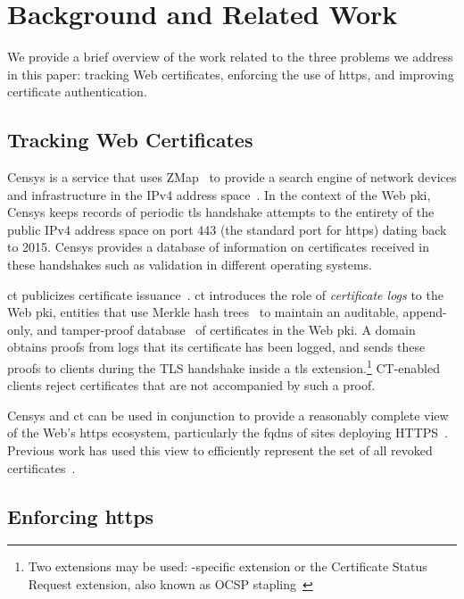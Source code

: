 \section{Background and Related Work}
\label{sec:background}

We provide a brief overview of the work related to the three problems we address
in this paper: tracking Web certificates, enforcing the use of \ac{https}, and
improving certificate authentication.

\subsection{Tracking Web Certificates}\label{sec:tracking}

Censys is a service that uses ZMap~\cite{durumeric2013zmap} to provide a search
engine of network devices and infrastructure in the IPv4 address
space~\cite{durumeric2015search}. In the context of the Web \ac{pki}, Censys
keeps records of periodic \ac{tls} handshake attempts to the entirety of the
public IPv4 address space on port 443 (the standard port for \ac{https}) dating
back to 2015. Censys provides a database of information on certificates received
in these handshakes such as validation in different operating systems.

\acf{ct} publicizes certificate issuance~\cite{rfc6962}. \ac{ct} introduces the
role of \emph{certificate logs} to the Web \ac{pki}, entities that use Merkle
hash trees~\cite{merkle1988digital} to maintain an auditable, append-only, and
tamper-proof database~\cite{crosby2009efficient} of certificates in the Web
\ac{pki}. A domain obtains proofs from logs that its certificate has been
logged, and sends these proofs to clients during the TLS handshake inside a
\ac{tls} extension.\footnote{Two extensions may be used: -specific
extension or the Certificate Status Request extension, also known as OCSP
stapling~\cite{rfc6066}} CT-enabled clients reject certificates that are not
accompanied by such a proof.

Censys and \ac{ct} can be used in conjunction to provide a reasonably complete
view of the Web's \ac{https} ecosystem, particularly the \acp{fqdn} of sites
deploying HTTPS~\cite{vandersloot2016towards}. Previous work has used this view
to efficiently represent the set of all revoked
certificates~\cite{larisch2017crlite}.

\subsection{Enforcing \ac{https}}
\label{sec:background:https}

